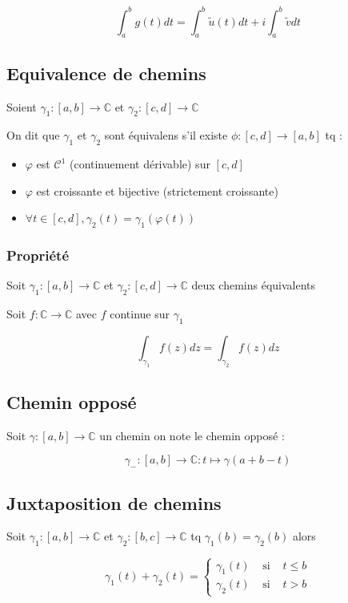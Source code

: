 \documentclass[a4paper,10pt]{report}
\newcommand{\ap}{\rightarrow}
\newcommand{\C}{\mathbb{C}}
\begin{document}
\[ \int_a^b g(t) dt = \int_a^b \tilde u(t) dt + i \int_a^b \tilde v dt \]

\subsection{Equivalence de chemins}

Soient $\gamma_1 : [a,b] \ap \C$ et $\gamma_2 : [c,d] \ap \C$

On dit que $\gamma_1$ et $\gamma_2$ sont équivalens s'il existe $\phi : [c,d] \ap [a,b]$ tq :

\begin{itemize}
\item{$\varphi$ est $\mathcal{C}^1$ (continuement dérivable) sur $[c,d]$}
\item{$\varphi$ est croissante et bijective (strictement croissante)}
\item{$\forall t \in [c,d], \gamma_2(t) = \gamma_1(\varphi(t))$}
\end{itemize}

\subsubsection{Propriété}

Soit $\gamma_1 : [a,b] \ap \C$ et $\gamma_2 : [c,d] \ap \C$ deux chemins équivalents

Soit $f : \C \ap \C$ avec $f$ continue sur $\gamma_1$

\[ \int_{\gamma_1} f(z) dz = \int_{\gamma_2} f(z) dz \]

\subsection{Chemin opposé}

Soit $\gamma : [a,b] \ap \C$ un chemin on note le chemin opposé :

\[\gamma_- : [a,b] \ap \C : t \mapsto \gamma(a + b - t) \]

\subsection{Juxtaposition de chemins}

Soit $\gamma_1 : [a,b] \ap \C$ et $\gamma_2 : [b,c] \ap \C$ tq $\gamma_1(b) = \gamma_2(b)$ alors

\[\gamma_1(t) + \gamma_2(t) = \left\{ \begin{array}{ccc}
\gamma_1(t) & \mbox{ si } & t \leq b \\
\gamma_2(t) & \mbox{ si } & t > b
\end{array} \right. \]
\end{document}
